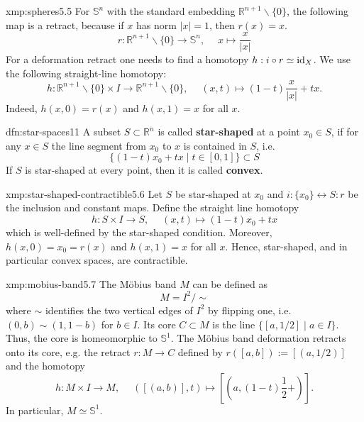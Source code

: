 \documentclass[landscape, 8pt]{extarticle}
\begin{document}
\begin{multicols*}{3}
\vspace{-2pt}
\begin{xmp}[Spheres]{xmp:spheres}{5.5}
	For $\mathbb{S}^{n}$ with the standard embedding $\mathbb{R}^{n+1} \backslash \{0\}$, the following map is a retract, because if $x$ has norm $\lvert x \rvert = 1$, then $r(x) = x$.
	\[r : \mathbb{R}^{n+1} \backslash \{0\} \to \mathbb{S}^{n},\;\quad x \mapsto \frac{x}{\lvert x \rvert}\]
	 For a deformation retract one needs to find a homotopy $h : i \circ r \simeq \operatorname{id}_{X}$. We use the following straight-line homotopy:
	\[h : \mathbb{R}^{n+1} \backslash \{0\} \times I \to \mathbb{R}^{n+1} \backslash \{0\},\;\quad (x, t) \mapsto (1-t) \frac{x}{\lvert x \rvert} + tx.\]
	Indeed, $h(x, 0) = r(x)$ and $h(x, 1) = x$ for all $x$.
\end{xmp}

\begin{dfn}{dfn:star-spaces}{11}
	A subset $S \subset \mathbb{R}^{n}$ is called \textbf{star-shaped} at a point $x_{0}\in S$, if for any $x\in S$ the line segment from $x_{0}$ to $x$ is contained in $S$, i.e.
	\[\{(1-t)x_{0} + tx \mid t\in [0,1]\} \subset S\]
	If $S$ is star-shaped at every point, then it is called \textbf{convex}.
\end{dfn}

\begin{xmp}{xmp:star-shaped-contractible}{5.6}
	Let $S$ be star-shaped at $x_{0}$ and $i : \{x_{0}\} \leftrightarrow S : r$ be the inclusion and constant maps. Define the straight line homotopy
	\[h : S \times I \to S,\;\quad (x, t) \mapsto (1 - t) x_{0} + tx\]
	which is well-defined by the star-shaped condition. Moreover, $h(x,0) = x_{0} = r(x)$ and $h(x,1) = x$ for all $x$. Hence, star-shaped, and in particular convex spaces, are contractible.
\end{xmp}

\begin{xmp}{xmp:mobius-band}{5.7}
	The M\"obius band $M$ can be defined as
	\[M = I^{2} / \sim\]
	where $\sim$ identifies the two vertical edges of $I^{2}$ by flipping one, \newline i.e. $(0, b) \sim (1,1-b)$ for $b\in I$. Its core $C \subset M$ is the line $\{[a, 1 /2] \mid a\in I\}$. Thus, the core is homeomorphic to $\mathbb{S}^{1}$. The M\"obius band deformation retracts onto its core, e.g. the retract $r : M \to C$ defined by $r([a, b]) := [(a, 1 /2)]$ and the homotopy
	\[h : M \times I \to M,\;\quad ([(a, b)], t) \mapsto \left[\left(a, (1-t) \frac{1}{2} + ^{}_{}\right)\right].\]
	In particular, $M \simeq \mathbb{S}^{1}$.
\end{xmp}


\end{multicols*}
\end{document}
